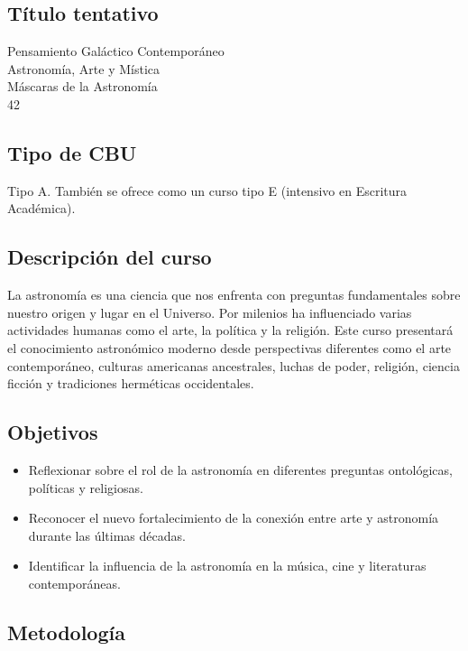 \documentclass{report}
\begin{document}
\subsection*{\bf T\'itulo tentativo}
Pensamiento Gal\'actico Contempor\'aneo\\
Astronom\'ia, Arte y M\'istica\\
M\'ascaras de la Astronom\'ia\\
42\\

\subsection*{Tipo de CBU}
Tipo A. Tambi\'en se ofrece como un curso tipo E (intensivo en
Escritura Acad\'emica). 


\subsection*{Descripci\'on del curso}
La astronom\'ia es una ciencia que nos enfrenta con preguntas
fundamentales sobre nuestro origen y lugar en el Universo. Por
milenios ha influenciado varias actividades humanas como el arte, la
pol\'itica y la religi\'on. Este curso presentar\'a el conocimiento
astron\'omico moderno desde perspectivas diferentes como el arte
contempor\'aneo, culturas americanas ancestrales, luchas de poder,
religi\'on, ciencia ficci\'on y tradiciones herm\'eticas occidentales.  

\subsection*{Objetivos}

\begin{itemize}
\item Reflexionar sobre el rol de la astronom\'ia en diferentes
  preguntas ontol\'ogicas, pol\'iticas y religiosas. 
\item Reconocer el nuevo fortalecimiento de la conexi\'on entre arte y
  astronom\'ia durante las \'ultimas d\'ecadas.
\item Identificar la influencia de la astronom\'ia en la m\'usica,
  cine y literaturas contempor\'aneas.
\end{itemize}

\subsection*{Metodolog\'ia}
\end{document}
